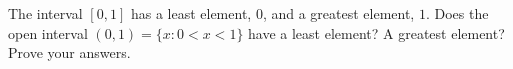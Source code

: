 The interval $[0,1]$ has a least element, $0$, and a greatest element, $1$. Does the open interval $(0,1)=\{x:0<x<1\}$ have a least element? A greatest element? Prove your answers.
